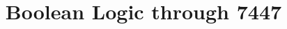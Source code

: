 \documentclass[journal,12pt,twocolumn]{IEEEtran}
\begin{document}

\makeatletter
{}
\makeatother

\let\StandardTheFigure\thefigure
\let\StandardTheTable\thetable
\renewcommand{\thetable}{\theproblem}




\def\putbox#1#2#3{\makebox[0in][l]{\makebox[#1][l]{}\raisebox{\baselineskip}[0in][0in]{\raisebox{#2}[0in][0in]{#3}}}}
     \def\rightbox#1{\makebox[0in][r]{#1}}
     \def\centbox#1{\makebox[0in]{#1}}
     \def\topbox#1{\raisebox{-\baselineskip}[0in][0in]{#1}}
     \def\midbox#1{\raisebox{-0.5\baselineskip}[0in][0in]{#1}}

\vspace{3cm}

\title{ 
Boolean Logic through 7447
}



%
%
%
\end{document}
